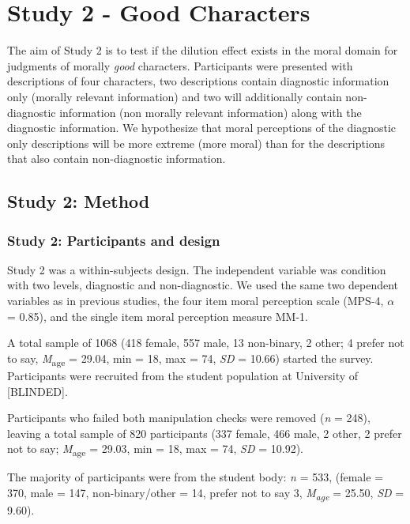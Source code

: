 \documentclass[
  english,
  man,floatsintext]{apa7}
\begin{document}
\hypertarget{study-2---good-characters}{%
\section{Study 2 - Good Characters}\label{study-2---good-characters}}

The aim of Study 2 is to test if the dilution effect exists in the moral domain for judgments of morally \emph{good} characters. Participants were presented with descriptions of four characters, two descriptions contain diagnostic information only (morally relevant information) and two will additionally contain non-diagnostic information (non morally relevant information) along with the diagnostic information. We hypothesize that moral perceptions of the diagnostic only descriptions will be more extreme (more moral) than for the descriptions that also contain non-diagnostic information.

\hypertarget{study-2-method}{%
\subsection{Study 2: Method}\label{study-2-method}}

\hypertarget{study-2-participants-and-design}{%
\subsubsection{Study 2: Participants and design}\label{study-2-participants-and-design}}

Study 2 was a within-subjects design. The independent variable was condition with two levels, diagnostic and non-diagnostic. We used the same two dependent variables as in previous studies, the four item moral perception scale (MPS-4, \(\alpha\) = 0.85), and the single item moral perception measure MM-1.

A total sample of 1068 (418 female, 557 male, 13 non-binary, 2 other; 4 prefer not to say, \emph{M}\textsubscript{age} = 29.04, min = 18, max = 74, \emph{SD} = 10.66) started the survey. Participants were recruited from the student population at University of {[}BLINDED{]}.

Participants who failed both manipulation checks were removed (\emph{n} = 248), leaving a total sample of 820 participants (337 female, 466 male, 2 other, 2 prefer not to say; \emph{M}\textsubscript{age} = 29.03, min = 18, max = 74, \emph{SD} = 10.92).

The majority of participants were from the student body: \emph{n} = 533, (female = 370, male = 147, non-binary/other = 14, prefer not to say 3, \emph{M\textsubscript{age}} = 25.50, \emph{SD} = 9.60).
\end{document}

